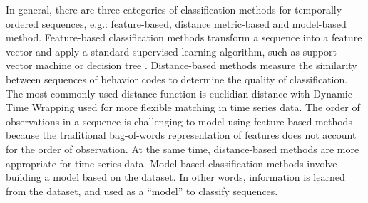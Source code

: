 \documentclass{amia_summit_2018}
\begin{document}

In general, there are three categories of classification methods for temporally ordered sequences, e.g.: feature-based, distance metric-based and model-based method. Feature-based classification methods transform a sequence into a feature vector and apply a standard supervised learning algorithm, such as support vector machine \cite{leslie2004fast} or decision tree \cite{chuzhanova1998feature}. 
Distance-based methods measure the similarity between sequences of behavior codes to determine the quality of classification. The most commonly used distance function is euclidian distance with Dynamic Time Wrapping \cite{keogh2000scaling} used for more flexible matching in time series data.  
The order of observations in a sequence is challenging to model using feature-based methods because the traditional bag-of-words representation of features does not account for the order of observation. At the same time, distance-based methods are more appropriate for time series data. Model-based classification methods involve building a model based on the dataset. In other words, information is learned from the dataset, and used as a ``model'' to classify sequences.  

\end{document}
